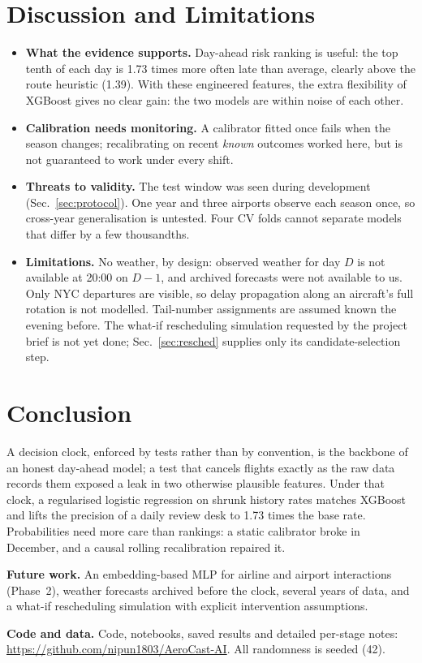 \documentclass[conference]{IEEEtran}
\begin{document}
\section{Discussion and Limitations}\label{sec:discussion}
\begin{itemize}
\item \textbf{What the evidence supports.} Day-ahead risk ranking is useful: the top tenth of each day is 1.73 times more often late than average, clearly above the route heuristic (1.39). With these engineered features, the extra flexibility of XGBoost gives no clear gain: the two models are within noise of each other.
\item \textbf{Calibration needs monitoring.} A calibrator fitted once fails when the season changes; recalibrating on recent \emph{known} outcomes worked here, but is not guaranteed to work under every shift.
\item \textbf{Threats to validity.} The test window was seen during development (Sec.~\ref{sec:protocol}). One year and three airports observe each season once, so cross-year generalisation is untested. Four CV folds cannot separate models that differ by a few thousandths.
\item \textbf{Limitations.} No weather, by design: observed weather for day $D$ is not available at 20:00 on $D-1$, and archived forecasts were not available to us. Only NYC departures are visible, so delay propagation along an aircraft's full rotation is not modelled. Tail-number assignments are assumed known the evening before. The what-if rescheduling simulation requested by the project brief is not yet done; Sec.~\ref{sec:resched} supplies only its candidate-selection step.
\end{itemize}

\section{Conclusion}\label{sec:conclusion}
A decision clock, enforced by tests rather than by convention, is the backbone of an honest day-ahead model; a test that cancels flights exactly as the raw data records them exposed a leak in two otherwise plausible features. Under that clock, a regularised logistic regression on shrunk history rates matches XGBoost and lifts the precision of a daily review desk to 1.73 times the base rate. Probabilities need more care than rankings: a static calibrator broke in December, and a causal rolling recalibration repaired it.

\textbf{Future work.} An embedding-based MLP for airline and airport interactions (Phase~2), weather forecasts archived before the clock, several years of data, and a what-if rescheduling simulation with explicit intervention assumptions.

\textbf{Code and data.} Code, notebooks, saved results and detailed per-stage notes: \url{https://github.com/nipun1803/AeroCast-AI}. All randomness is seeded (42).



\end{document}
